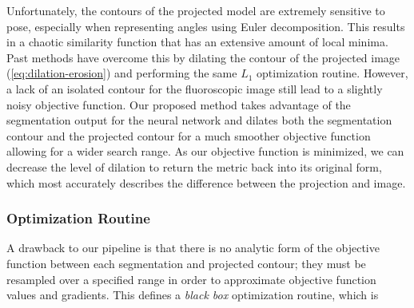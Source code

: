 Unfortunately, the contours of the projected model are extremely sensitive to pose, especially when representing angles using Euler decomposition. This results in a chaotic similarity function that has an extensive amount of local minima. Past methods have overcome this by dilating the contour of the projected image (\cref{eq:dilation-erosion}) and performing the same $L_1$ optimization routine. However, a lack of an isolated contour for the fluoroscopic image still lead to a slightly noisy objective function. Our proposed method takes advantage of the segmentation output for the neural network and dilates both the segmentation contour and the projected contour for a much smoother objective function allowing for a wider search range. As our objective function is minimized, we can decrease the level of dilation to return the metric back into its original form, which most accurately describes the difference between the projection and image.

\subsubsection{Optimization Routine}
A drawback to our pipeline is that there is no analytic form of the objective function between each segmentation and projected contour; they must be resampled over a specified range in order to approximate objective function values and gradients. This defines a \emph{black box} optimization routine, which is 